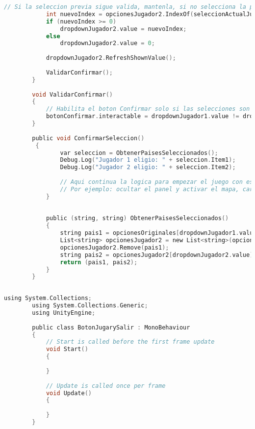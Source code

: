 \documentclass[a4paper,12pt]{article}
\begin{document}
\begin{itemize}
\begin{lstlisting}[language=c, caption={SeleccionPaisController}]
            // Si la seleccion previa sigue valida, mantenla, si no selecciona la primera opcion
            int nuevoIndex = opcionesJugador2.IndexOf(seleccionActualJugador2);
            if (nuevoIndex >= 0)
                dropdownJugador2.value = nuevoIndex;
            else
                dropdownJugador2.value = 0;
        
            dropdownJugador2.RefreshShownValue();
        
            ValidarConfirmar();
        }
        
        void ValidarConfirmar()
        {
            // Habilita el boton Confirmar solo si las selecciones son diferentes
            botonConfirmar.interactable = dropdownJugador1.value != dropdownJugador2.value;
        }
        
        public void ConfirmarSeleccion()
         {
                var seleccion = ObtenerPaisesSeleccionados();
                Debug.Log("Jugador 1 eligio: " + seleccion.Item1);
                Debug.Log("Jugador 2 eligio: " + seleccion.Item2);
        
                // Aqui continua la logica para empezar el juego con esos paises.
                // Por ejemplo: ocultar el panel y activar el mapa, cargar datos, etc.
            }
        
        
            public (string, string) ObtenerPaisesSeleccionados()
            {
                string pais1 = opcionesOriginales[dropdownJugador1.value];
                List<string> opcionesJugador2 = new List<string>(opcionesOriginales);
                opcionesJugador2.Remove(pais1);
                string pais2 = opcionesJugador2[dropdownJugador2.value];
                return (pais1, pais2);
            }
        }
        
    \end{lstlisting}

        \begin{lstlisting}[language=c, caption={BotonJugarySalir}]
        using System.Collections;
        using System.Collections.Generic;
        using UnityEngine;
        
        public class BotonJugarySalir : MonoBehaviour
        {
            // Start is called before the first frame update
            void Start()
            {
                
            }
        
            // Update is called once per frame
            void Update()
            {
                
            }
        }
    \end{lstlisting}
\end{itemize}
\end{document}
